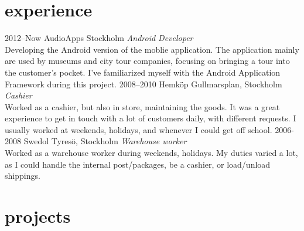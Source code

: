 \documentclass[]{friggeri-cv} %
\begin{document}

\section{experience}

\begin{entrylist}
\entry
{2012--Now}
{AudioApps}
{Stockholm}
{\emph{Android Developer} \\
Developing the Android version of the moblie application. The application mainly are used by museums and city tour companies, focusing on bringing a tour into the customer's pocket. I've familiarized myself with the Android Application Framework during this project.}
\entry
{2008--2010}
{Hemköp}
{Gullmarsplan, Stockholm}
{\emph{Cashier} \\
Worked as a cashier, but also in store, maintaining the goods. It was a great experience to get in touch with a lot of customers daily, with different requests. I usually worked at weekends, holidays, and whenever I could get off school.}
\entry
{2006-2008}
{Swedol}
{Tyresö, Stockholm}
{\emph{Warehouse worker} \\
Worked as a warehouse worker during weekends, holidays. My duties varied a lot, as I could handle the internal post/packages, be a cashier, or load/unload shippings.}
\end{entrylist}

\clearpage


\section{projects}
\end{document}
